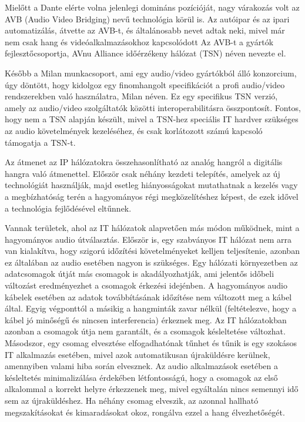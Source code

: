 Mielőtt a Dante elérte volna jelenlegi domináns pozícióját, nagy várakozás volt az AVB
(Audio Video Bridging) nevű technológia körül is.
Az autóipar és az ipari automatizálás, átvette az AVB-t, és
általánosabb nevet adtak neki, mivel már nem csak hang és videóalkalmazásokhoz kapcsolódott
Az AVB-t a gyártók fejlesztőcsoportja, AVnu Alliance időérzékeny hálózat (TSN) néven nevezte el.

Később a Milan munkacsoport, ami egy audio/video gyártókból álló konzorcium, úgy
döntött, hogy kidolgoz egy finomhangolt specifikációt a profi audio/video
rendszerekben való használatra, Milan néven.
Ez egy specifikus TSN verzió, amely az audio/video szolgáltatók közötti interoperabilitásra összpontosít.
Fontos, hogy nem a TSN alapján készült, mivel a TSN-hez speciális IT hardver szükséges az audio
követelmények kezeléséhez, és csak korlátozott számú kapcsoló támogatja a TSN-t.

Az átmenet az IP hálózatokra összehasonlítható az analóg hangról a digitális
hangra való átmenettel. Először csak néhány kezdeti telepítés, amelyek az új technológiát
használják, majd esetleg hiányosságokat mutathatnak a kezelés vagy a megbízhatóság
terén a hagyományos régi megközelítéshez képest, de ezek idővel a technológia fejlődésével eltűnnek. 

Vannak területek, ahol az IT hálózatok alapvetően más módon működnek, mint a hagyományos audio útválasztás.
Először is, egy szabványos IT hálózat nem arra van kialakítva, hogy szigorú időzítési követelményeket kelljen teljesítenie, 
azonban ez általában az audio esetében nagyon is szükséges.
Egy hálózati környezetben az adatcsomagok útját más csomagok is akadályozhatják, ami jelentős
időbeli változást eredményezhet a csomagok érkezési idejénben.
A hagyományos audio kábelek esetében az adatok továbbításának időzítése nem változott meg a kábel által.
Egyig végponttól a másikig a hangminták zavar nélkül (feltételezve, hogy a kábel jó minőségű és nincsen interferencia) 
érkeznek meg. Az IT hálózatokban azonban a csomagok útja nem garantált, és a csomagok késleltetése változhat.
Másodszor, egy csomag elvesztése elfogadhatónak tűnhet és tűnik is egy szokásos IT
alkalmazás esetében, mivel azok automatikusan újraküldésre kerülnek, amennyiben valami hiba során elvesznek.
Az audio alkalmazások esetében a késleltetés minimalizálása érdekében
létfontosságú, hogy a csomagok az első alkalommal a korrekt helyre érkezzenek meg, mivel egyáltalán nincs semennyi
idő sem az újraküldéshez. Ha néhány csomag elveszik, az azonnal hallható megszakításokat és kimaradásokat okoz,
rongálva ezzel a hang élvezhetőségét.

